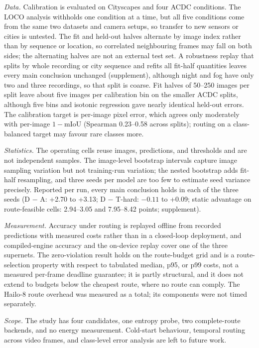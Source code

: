 \documentclass[a4paper,5p]{elsarticle}
\newcommand{\miou}{mIoU}
\begin{document}
\emph{Data.} Calibration is evaluated on Cityscapes and four ACDC conditions. The LOCO analysis withholds one condition at a time, but all five conditions come from the same two datasets and camera setups, so transfer to new sensors or cities is untested. The fit and held-out halves alternate by image index rather than by sequence or location, so correlated neighbouring frames may fall on both sides; the alternating halves are not an external test set. A robustness replay that splits by whole recording or city sequence and refits all fit-half quantities leaves every main conclusion unchanged (supplement), although night and fog have only two and three recordings, so that split is coarse. Fit halves of 50--250 images per split leave about five images per calibration bin on the smaller ACDC splits, although five bins and isotonic regression gave nearly identical held-out errors. The calibration target is per-image pixel error, which agrees only moderately with per-image $1-$\miou{} (Spearman 0.23--0.58 across splits); routing on a class-balanced target may favour rare classes more.

\emph{Statistics.} The operating cells reuse images, predictions, and thresholds and are not independent samples. The image-level bootstrap intervals capture image sampling variation but not training-run variation; the nested bootstrap adds fit-half resampling, and three seeds per model are too few to estimate seed variance precisely. Reported per run, every main conclusion holds in each of the three seeds (D $-$ A: +2.70 to +3.13; D $-$ T-hard: $-0.11$ to +0.09; static advantage on route-feasible cells: 2.94--3.05 and 7.95--8.42 points; supplement).

\emph{Measurement.} Accuracy under routing is replayed offline from recorded predictions with measured costs rather than in a closed-loop deployment, and compiled-engine accuracy and the on-device replay cover one of the three supernets. The zero-violation result holds on the route-budget grid and is a route-selection property with respect to tabulated median, p95, or p99 costs, not a measured per-frame deadline guarantee; it is partly structural, and it does not extend to budgets below the cheapest route, where no route can comply. The Hailo-8 route overhead was measured as a total; its components were not timed separately.

\emph{Scope.} The study has four candidates, one entropy probe, two complete-route backends, and no energy measurement. Cold-start behaviour, temporal routing across video frames, and class-level error analysis are left to future work.
\end{document}

